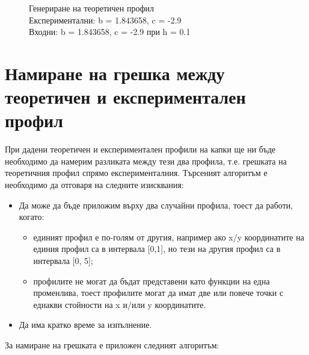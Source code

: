 \documentclass{article}
\begin{document}
\begin{figure}[H]
\begin{minipage}{0.5\textwidth}
  \caption{Генериране на теоретичен профил \protect\\ Експериментални: b = 1.843658, c = -2.9 \protect\\ Входни: b = 1.843658, c = -2.9 при h = 0.1}
\end{minipage}
\end{figure}

\section{Намиране на грешка между теоретичен и експериментален профил}
При дадени теоретичен и експериментален профили на капки ще ни бъде необходимо да намерим разликата между тези два профила, т.е. грешката на теоретичния профил спрямо експерименталния. Търсеният алгоритъм е необходимо да отговаря на следните изисквания:
\begin{itemize}
    \item Да може да бъде приложим върху два случайни профила, тоест да работи, когато:
    \begin{itemize}
        \item единият профил е по-голям от другия, например ако x/y координатите на единия профил са в интервала [0,1], но тези на другия профил са в интервала [0, 5];
        \item профилите не могат да бъдат представени като функции на една променлива, тоест профилите могат да имат две или повече точки с еднакви стойности на x и/или y координатите.
    \end{itemize}
    \item Да има кратко време за изпълнение.
\end{itemize}
За намиране на грешката е приложен следният алгоритъм:
\renewcommand{\labelenumi}{\arabic{enumi}}
\end{document}
